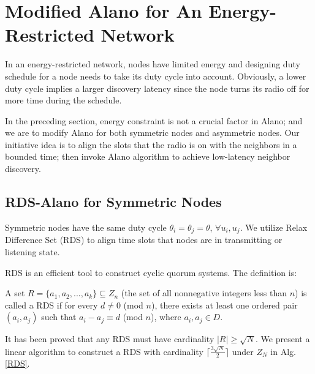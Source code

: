 \section{Modified Alano for An Energy-Restricted Network}
\label{EEN}
In an energy-restricted network, nodes have limited energy and designing duty schedule for a node needs to take its duty cycle into account. Obviously, a lower duty cycle implies a larger discovery latency since the node turns its radio off for more time during the schedule. 

In the preceding section, energy constraint is not a crucial factor in Alano; and we are to modify Alano for both symmetric nodes and asymmetric nodes.
Our initiative idea is to align the slots that the radio is on with the neighbors in a bounded time; then invoke Alano algorithm to achieve low-latency neighbor discovery. 


\subsection{RDS-Alano for Symmetric Nodes}


Symmetric nodes have the same duty cycle $\theta_i = \theta_j = \theta$, $\forall u_i, u_j$. We utilize Relax Difference Set (RDS) to align time slots that nodes are in transmitting or listening state.


RDS is an efficient tool to construct cyclic quorum systems\cite{jiang2005quorum,luk1997two}. The definition is:
\begin{definition}
A set $R=\{a_1,a_2,...,a_k\} \subseteq Z_n$ (the set of all nonnegative integers less than $n$)
is called a RDS if for every $d \neq 0$ (mod $n$),
there exists at least one ordered pair $(a_i,a_j)$ such that $a_i - a_j \equiv d$ (mod $n$), where $a_i,a_j \in D$.
\end{definition}


It has been proved that any RDS must have cardinality $|R| \geq \sqrt{N}$\cite{luk1997two}.
We present a linear algorithm to construct a RDS with cardinality $\lceil \frac{3\sqrt{N}}{2}  \rceil$ under $Z_N$ in Alg. \ref{RDS}.


